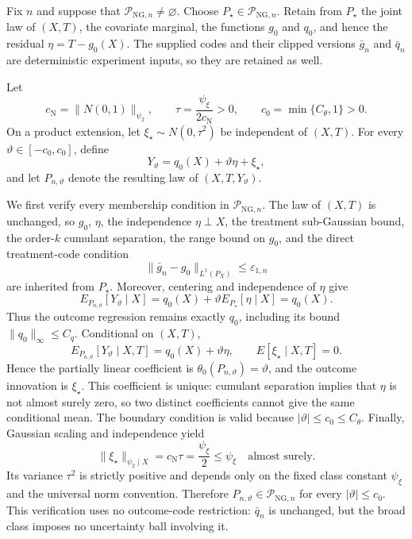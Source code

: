 Fix \(n\) and suppose that \(\mathcal P_{\mathrm{NG},n}\neq\varnothing\).  Choose \(P_{\star}\in\mathcal P_{\mathrm{NG},n}\).  Retain from \(P_{\star}\) the joint law of \((X,T)\), the covariate marginal, the functions \(g_0\) and \(q_0\), and hence the residual \(\eta=T-g_0(X)\).  The supplied codes and their clipped versions \(\bar g_n\) and \(\bar q_n\) are deterministic experiment inputs, so they are retained as well.

Let
\[
 c_{\mathrm N}=\lVert N(0,1)\rVert_{\psi_2},
 \qquad
 \tau=\frac{\psi_{\xi}}{2c_{\mathrm N}}>0,
 \qquad
 c_0=\min\{C_{\theta},1\}>0.
\]
On a product extension, let \(\xi_{\star}\sim N(0,\tau^2)\) be independent of \((X,T)\).  For every \(\vartheta\in[-c_0,c_0]\), define
\[
 Y_{\vartheta}=q_0(X)+\vartheta\eta+\xi_{\star},
\]
and let \(P_{n,\vartheta}\) denote the resulting law of \((X,T,Y_{\vartheta})\).

We first verify every membership condition in \(\mathcal P_{\mathrm{NG},n}\).  The law of \((X,T)\) is unchanged, so \(g_0\), \(\eta\), the independence \(\eta\perp X\), the treatment sub-Gaussian bound, the order-\(k\) cumulant separation, the range bound on \(g_0\), and the direct treatment-code condition
\[
 \lVert\bar g_n-g_0\rVert_{L^1(P_X)}\le\varepsilon_{1,n}
\]
are inherited from \(P_{\star}\).  Moreover, centering and independence of \(\eta\) give
\[
 E_{P_{n,\vartheta}}[Y_{\vartheta}\mid X]
 =q_0(X)+\vartheta E_{P_{\star}}[\eta\mid X]
 =q_0(X).
\]
Thus the outcome regression remains exactly \(q_0\), including its bound \(\lVert q_0\rVert_{\infty}\le C_q\).  Conditional on \((X,T)\),
\[
 E_{P_{n,\vartheta}}[Y_{\vartheta}\mid X,T]
 =q_0(X)+\vartheta\eta,
 \qquad
 E[\xi_{\star}\mid X,T]=0.
\]
Hence the partially linear coefficient is \(\theta_0(P_{n,\vartheta})=\vartheta\), and the outcome innovation is \(\xi_{\star}\).  This coefficient is unique: cumulant separation implies that \(\eta\) is not almost surely zero, so two distinct coefficients cannot give the same conditional mean.  The boundary condition is valid because \(|\vartheta|\le c_0\le C_{\theta}\).  Finally, Gaussian scaling and independence yield
\[
 \lVert\xi_{\star}\rVert_{\psi_2\mid X}
 =c_{\mathrm N}\tau
 =\frac{\psi_{\xi}}{2}
 \le\psi_{\xi}
 \quad\text{almost surely}.
\]
Its variance \(\tau^2\) is strictly positive and depends only on the fixed class constant \(\psi_{\xi}\) and the universal norm convention.  Therefore \(P_{n,\vartheta}\in\mathcal P_{\mathrm{NG},n}\) for every \(|\vartheta|\le c_0\).  This verification uses no outcome-code restriction: \(\bar q_n\) is unchanged, but the broad class imposes no uncertainty ball involving it.

